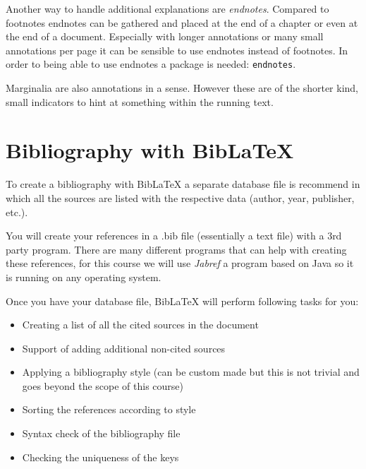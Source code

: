 \documentclass[11pt, a4paper]{article}
\newcommand{\ltx}{\LaTeX}
\let\oldmarginpar\marginpar
\renewcommand{\marginpar}[1]{\oldmarginpar{\textit{#1}}}
\begin{document}
Another way to handle additional explanations are \textit{endnotes}\marginpar{endnotes}. Compared to footnotes endnotes can be gathered and placed at the end of a chapter or even at the end of a document. Especially with longer annotations or many small annotations per page it can be sensible to use endnotes instead of footnotes. In order to being able to use endnotes a package is needed: \texttt{endnotes}.

Marginalia\marginpar{Marginalia} are also annotations in a sense. However these are of the shorter kind, small indicators to hint at something within the running text.

\section{Bibliography with Bib\LaTeX}

To create a bibliography with Bib\ltx{} a separate database file is recommend in which all the sources are listed with the respective data (author, year, publisher, etc.). 

You will create your references in a .bib file (essentially a text file) with a 3rd party program. There are many different programs that can help with creating these references, for this course we will use \textit{Jabref} a program based on Java so it is running on any operating system.

Once you have your database file, Bib\ltx{} will perform following tasks for you:
\begin{itemize}
\item Creating a list of all the cited sources in the document
\item Support of adding additional non-cited sources
\item Applying a bibliography style (can be custom made but this is not trivial and goes beyond the scope of this course)
\item Sorting the references according to style
\item Syntax check of the bibliography file
\item Checking the uniqueness of the keys
\end{itemize}
\end{document}
